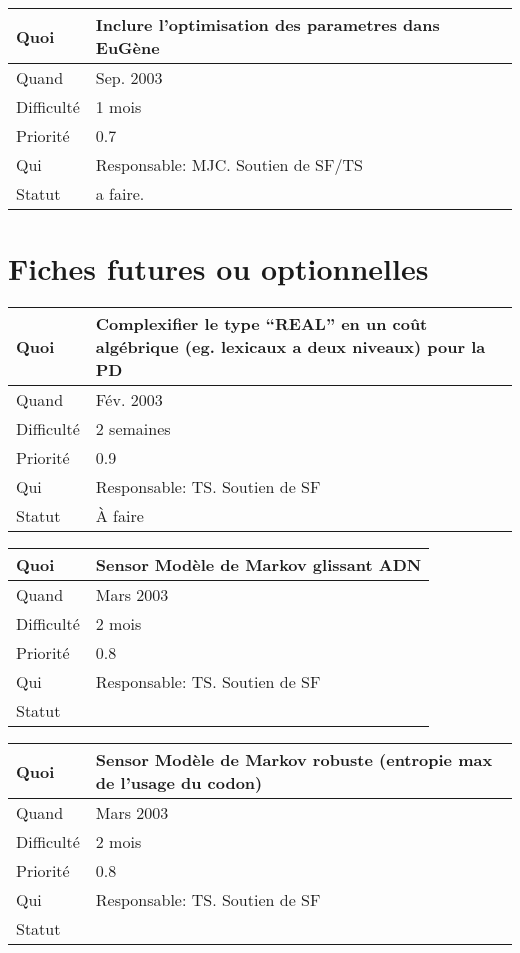 \documentclass[a4paper,11pt]{article}
\begin{document}
\begin{longtable}{|l|p{7cm}|}\hline
  Quoi & Inclure l'optimisation des parametres dans EuG\`ene\\\hline
  Quand  &  Sep. 2003\\\hline
  Difficult\'e & 1 mois \\\hline
  Priorit\'e & 0.7\\\hline
  Qui & Responsable: MJC. Soutien de SF/TS\\\hline
  Statut & a faire.\\\hline
\end{longtable}

\section{Fiches futures ou optionnelles}

\begin{longtable}{|l|p{7cm}|}\hline
  Quoi & Complexifier le type ``REAL'' en un co\^ut alg\'ebrique
  (eg. lexicaux a deux niveaux) pour la PD\\\hline
  Quand  & F\'ev. 2003 \\\hline
  Difficult\'e &  2 semaines\\\hline
  Priorit\'e &  0.9\\\hline
  Qui & Responsable: TS. Soutien de SF\\\hline
  Statut & \`A faire\\\hline
\end{longtable}

\begin{longtable}{|l|p{7cm}|}\hline
  Quoi & Sensor Mod\`ele de Markov glissant ADN \\\hline
  Quand  &  Mars 2003 \\\hline
  Difficult\'e &  2 mois \\\hline
  Priorit\'e &  0.8 \\\hline
  Qui & Responsable: TS. Soutien de SF\\\hline
  Statut & \\\hline
\end{longtable}

\begin{longtable}{|l|p{7cm}|}\hline
  Quoi & Sensor Mod\`ele de Markov robuste (entropie max de l'usage du codon)\\\hline
  Quand  &  Mars 2003\\\hline
  Difficult\'e &  2 mois\\\hline
  Priorit\'e &  0.8\\\hline
  Qui & Responsable: TS. Soutien de SF\\\hline
  Statut & \\\hline
\end{longtable}
\end{document}
